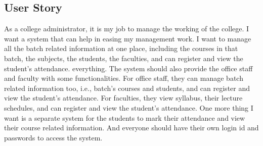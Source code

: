 \subsection{User Story}
\hspace{1cm}As a college administrator, it is my job to manage the working of the college. I want a system that can help in easing my management work. I want to manage all the batch related information at one place, including the courses in that batch, the subjects, the students, the faculties, and can register and view the student's attendance. everything. The system should also provide the office staff and faculty with some functionalities. For office staff, they can manage batch related information too, i.e., batch's courses and students, and can register and view the student's attendance. For faculties, they view syllabus, their lecture schedules, and can register and view the student's attendance. One more thing I want is a separate system for the students to mark their attendance and view their course related information. And everyone should have their own login id and passwords to access the system.